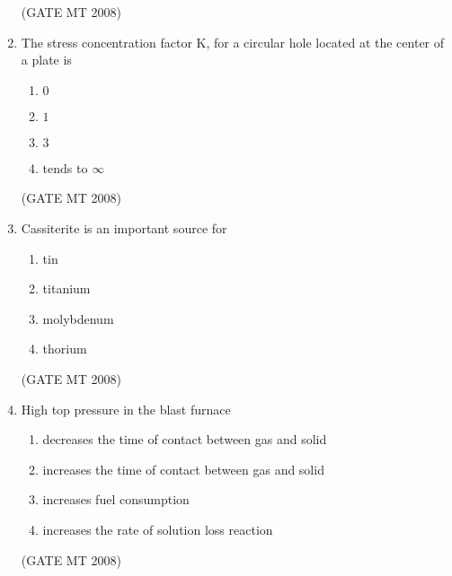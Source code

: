 \documentclass[11pt, letterpaper]{article}
\theoremstyle{remark}
\begin{document}
\begin{enumerate}[label=Q.\arabic*]
\hfill(GATE MT 2008)

\item The stress concentration factor K, for a circular hole located at the center of a plate is
\vspace{-0.9em}
\begin{multicols}{4}
 \begin{enumerate}[label=(\MakeUppercase{\alph*})]
  \item $0$
  \item $1$
  \item $3$ 
  \item tends to $\infty$
 \end{enumerate}
\end{multicols}
\vspace{-5mm}

\hfill(GATE MT 2008)

\item Cassiterite is an important source for
\vspace{-0.9em}
\begin{multicols}{4}
 \begin{enumerate}[label=(\MakeUppercase{\alph*})]
  \item tin
  \item titanium 
  \item molybdenum
  \item thorium
 \end{enumerate}
\end{multicols}
\vspace{-5mm}
\hfill(GATE MT 2008)

\item High top pressure in the blast furnace
\vspace{-0.9em}
\begin{multicols}{1}
 \begin{enumerate}[label=(\MakeUppercase{\alph*})]
  \item decreases the time of contact between gas and solid
  \item increases the time of contact between gas and solid 
  \item increases fuel consumption
  \item increases the rate of solution loss reaction
 \end{enumerate}
\end{multicols}
\vspace{-5mm}
\hfill (GATE MT 2008)


\end{enumerate}
\end{document}
